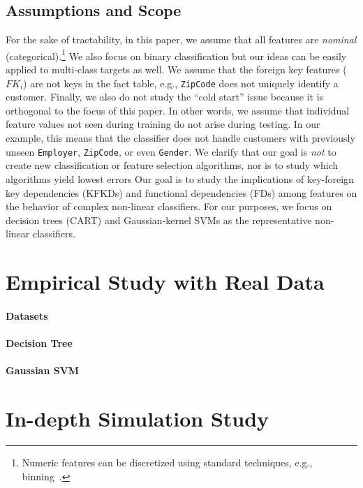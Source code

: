 \documentclass[sigconf]{acmart}
\begin{document}
\subsection{Assumptions and Scope}
For the sake of tractability, in this paper, we assume that all features are \textit{nominal} (categorical).\footnote{Numeric features can be discretized 
using standard techniques, e.g., binning~\cite{mitchell}.} We also focus on binary classification but our ideas can be easily applied to multi-class targets as well.
We assume that the foreign key features ($FK_i$) are not keys in the fact table, e.g., \texttt{ZipCode} does not uniquely identify a customer.
Finally, we also do not study the ``cold start'' issue because it is orthogonal to the focus of this paper. 
In other words, we assume that individual feature values not seen during training do not arise during testing. 
In our example, this means that the classifier does not handle customers with previously unseen \texttt{Employer}, \texttt{ZipCode}, or even \texttt{Gender}. 
We clarify that our goal is \textit{not} to create new classification or feature selection algorithms, nor is to study which algorithms yield lowest errors
Our goal is to study the implications of key-foreign key dependencies (KFKDs) and functional dependencies (FDs) among features on the behavior of complex non-linear classifiers.
For our purposes, we focus on decision trees (CART) and Gaussian-kernel SVMs as the representative non-linear classifiers.



\section{Empirical Study with Real Data}

\paragraph*{Datasets}

\paragraph*{Decision Tree}

\paragraph*{Gaussian SVM}


\section{In-depth Simulation Study}
\end{document}
